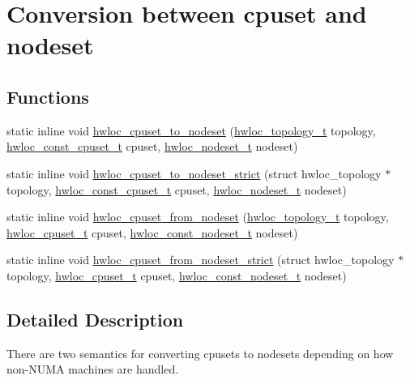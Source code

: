 \hypertarget{a00062}{
\section{Conversion between cpuset and nodeset}
\label{a00062}
}
\subsection*{Functions}
\begin{DoxyCompactItemize}
\item 
static inline void \hyperlink{a00062_ga60ecc4ae480c28b5fbd34aca4fc37daa}{hwloc\_\-cpuset\_\-to\_\-nodeset} (\hyperlink{a00039_ga9d1e76ee15a7dee158b786c30b6a6e38}{hwloc\_\-topology\_\-t} topology, \hyperlink{a00040_ga1f784433e9b606261f62d1134f6a3b25}{hwloc\_\-const\_\-cpuset\_\-t} cpuset, \hyperlink{a00040_ga37e35730fa7e775b5bb0afe893d6d508}{hwloc\_\-nodeset\_\-t} nodeset)
\item 
static inline void \hyperlink{a00062_ga9162785e39d7c697f76f99524c4a2fb4}{hwloc\_\-cpuset\_\-to\_\-nodeset\_\-strict} (struct hwloc\_\-topology $\ast$topology, \hyperlink{a00040_ga1f784433e9b606261f62d1134f6a3b25}{hwloc\_\-const\_\-cpuset\_\-t} cpuset, \hyperlink{a00040_ga37e35730fa7e775b5bb0afe893d6d508}{hwloc\_\-nodeset\_\-t} nodeset)
\item 
static inline void \hyperlink{a00062_gaa677fd588304b5615de4ea78104adfb5}{hwloc\_\-cpuset\_\-from\_\-nodeset} (\hyperlink{a00039_ga9d1e76ee15a7dee158b786c30b6a6e38}{hwloc\_\-topology\_\-t} topology, \hyperlink{a00040_ga4bbf39b68b6f568fb92739e7c0ea7801}{hwloc\_\-cpuset\_\-t} cpuset, \hyperlink{a00040_ga2f5276235841ad66a79bedad16a5a10c}{hwloc\_\-const\_\-nodeset\_\-t} nodeset)
\item 
static inline void \hyperlink{a00062_gaa7c3f39802b00a758c58e024a8119979}{hwloc\_\-cpuset\_\-from\_\-nodeset\_\-strict} (struct hwloc\_\-topology $\ast$topology, \hyperlink{a00040_ga4bbf39b68b6f568fb92739e7c0ea7801}{hwloc\_\-cpuset\_\-t} cpuset, \hyperlink{a00040_ga2f5276235841ad66a79bedad16a5a10c}{hwloc\_\-const\_\-nodeset\_\-t} nodeset)
\end{DoxyCompactItemize}


\subsection{Detailed Description}
There are two semantics for converting cpusets to nodesets depending on how non-\/NUMA machines are handled.

